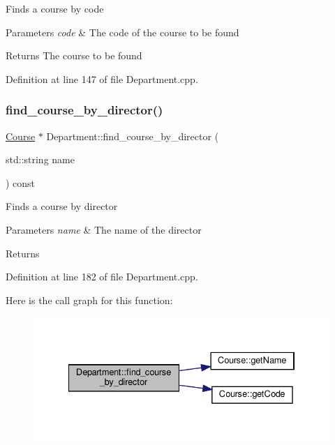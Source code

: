 Finds a course by code 
\begin{DoxyParams}{Parameters}
{\em code} & The code of the course to be found \\
\hline
\end{DoxyParams}
\begin{DoxyReturn}{Returns}
The course to be found 
\end{DoxyReturn}


Definition at line 147 of file Department.\+cpp.

\mbox{\label{classDepartment_a5d83db657bd838d17ac04be757f887a5}} 
\subsubsection{\texorpdfstring{find\+\_\+course\+\_\+by\+\_\+director()}{find\_course\_by\_director()}}
{\footnotesize\ttfamily \hyperlink{classCourse}{Course} $\ast$ Department\+::find\+\_\+course\+\_\+by\+\_\+director (\begin{DoxyParamCaption}\item[{std\+::string}]{name }\end{DoxyParamCaption}) const}

Finds a course by director 
\begin{DoxyParams}{Parameters}
{\em name} & The name of the director \\
\hline
\end{DoxyParams}
\begin{DoxyReturn}{Returns}

\end{DoxyReturn}


Definition at line 182 of file Department.\+cpp.

Here is the call graph for this function\+:\nopagebreak
\begin{figure}[H]
\begin{center}
\leavevmode
\includegraphics[width=334pt]{classDepartment_a5d83db657bd838d17ac04be757f887a5_cgraph}
\end{center}
\end{figure}
\mbox{\label{classDepartment_a2f776e8ddcf895cccdf60beb206b8620}} 
